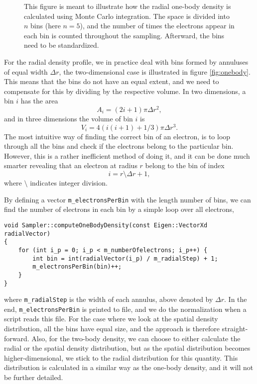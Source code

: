 \begin{figure}
	\centering
	
	\caption{This figure is meant to illustrate how the radial one-body density is calculated using Monte Carlo integration. The space is divided into $n$ bins (here $n=5$), and the number of times the electrons appear in each bin is counted throughout the sampling. Afterward, the bins need to be standardized.}
	\label{fig:onebody}
\end{figure}
For the radial density profile, we in practice deal with bins formed by annuluses of equal width $\Delta r$, the two-dimensional case is illustrated in figure \eqref{fig:onebody}. This means that the bins do not have an equal extent, and we need to compensate for this by dividing by the respective volume. In two dimensions, a bin $i$ has the area
\begin{equation}
A_i=(2i+1)\pi \Delta r^2,
\end{equation}
and in three dimensions the volume of bin $i$ is
\begin{equation}
V_i=4(i(i+1)+1/3)\pi \Delta r^3.
\end{equation}
The most intuitive way of finding the correct bin of an electron, is to loop through all the bins and check if the electrons belong to the particular bin. However, this is a rather inefficient method of doing it, and it can be done much smarter revealing that an electron at radius $r$ belong to the bin of index
\begin{equation}
i=r\setminus \Delta r + 1,
\end{equation}
where $\setminus$ indicates integer division. 

By defining a vector \lstinline|m_electronsPerBin| with the length number of bins, we can find the number of electrons in each bin by a simple loop over all electrons,
\begin{lstlisting}
void Sampler::computeOneBodyDensity(const Eigen::VectorXd radialVector)
{
	for (int i_p = 0; i_p < m_numberOfelectrons; i_p++) {
		int bin = int(radialVector(i_p) / m_radialStep) + 1;
		m_electronsPerBin(bin)++;
	}
}
\end{lstlisting}
where \lstinline|m_radialStep| is the width of each annulus, above denoted by $\Delta r$. In the end, \lstinline|m_electronsPerBin| is printed to file, and we do the normalization when a script reads this file. For the case where we look at the spatial density distribution, all the bins have equal size, and the approach is therefore straight-forward. Also, for the two-body density, we can choose to either calculate the radial or the spatial density distribution, but as the spatial distribution becomes higher-dimensional, we stick to the radial distribution for this quantity. This distribution is calculated in a similar way as the one-body density, and it will not be further detailed. 

